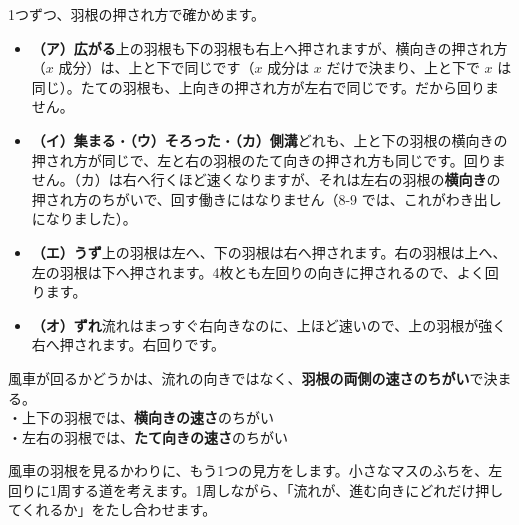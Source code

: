 1つずつ、羽根の押され方で確かめます。
\begin{itemize}[leftmargin=1.2\zw, itemsep=2pt, topsep=2pt, label={\color{\bkTT}●}]
\item \textbf{（ア）広がる}\quad 上の羽根も下の羽根も右上へ押されますが、横向きの押され方（$x$ 成分）は、上と下で同じです（$x$ 成分は $x$ だけで決まり、上と下で $x$ は同じ）。たての羽根も、上向きの押され方が左右で同じです。だから回りません。
\item \textbf{（イ）集まる}・\textbf{（ウ）そろった}・\textbf{（カ）側溝}\quad どれも、上と下の羽根の横向きの押され方が同じで、左と右の羽根のたて向きの押され方も同じです。回りません。（カ）は右へ行くほど速くなりますが、それは左右の羽根の\textbf{横向き}の押され方のちがいで、回す働きにはなりません（8-9 では、これがわき出しになりました）。
\item \textbf{（エ）うず}\quad 上の羽根は左へ、下の羽根は右へ押されます。右の羽根は上へ、左の羽根は下へ押されます。4枚とも左回りの向きに押されるので、よく回ります。
\item \textbf{（オ）ずれ}\quad 流れはまっすぐ右向きなのに、上ほど速いので、上の羽根が強く右へ押されます。右回りです。
\end{itemize}

\begin{taisetsu}
風車が回るかどうかは、流れの向きではなく、\textbf{羽根の両側の速さのちがい}で決まる。\\
・上下の羽根では、\textbf{横向きの速さ}のちがい\\
・左右の羽根では、\textbf{たて向きの速さ}のちがい
\end{taisetsu}


\leavevmode\label{bk:8-10:junkan}風車の羽根を見るかわりに、もう1つの見方をします。小さなマスのふちを、左回りに1周する道を考えます。1周しながら、「流れが、進む向きにどれだけ押してくれるか」をたし合わせます。

